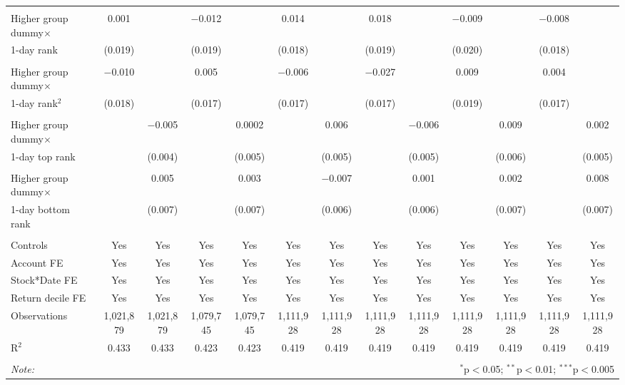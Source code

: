 \begin{tabular}{@{\extracolsep{2pt}}lcccccccccccc}
& & & & & & & & & & & & \\ 
Higher group dummy$\times$ & 0.001 &  & $-$0.012 &  & 0.014 &  & 0.018 &  & $-$0.009 &  & $-$0.008 &  \\ 
1-day rank & (0.019) &  & (0.019) &  & (0.018) &  & (0.019) &  & (0.020) &  & (0.018) &  \\ 
& & & & & & & & & & & & \\ 
Higher group dummy$\times$  & $-$0.010 &  & 0.005 &  & $-$0.006 &  & $-$0.027 &  & 0.009 &  & 0.004 &  \\ 
1-day rank$^2$& (0.018) &  & (0.017) &  & (0.017) &  & (0.017) &  & (0.019) &  & (0.017) &  \\ 
& & & & & & & & & & & & \\
Higher group dummy$\times$ &  & $-$0.005 &  & 0.0002 &  & 0.006 &  & $-$0.006 &  & 0.009 &  & 0.002 \\ 
1-day top rank &  & (0.004) &  & (0.005) &  & (0.005) &  & (0.005) &  & (0.006) &  & (0.005) \\ 
& & & & & & & & & & & & \\   
Higher group dummy$\times$ &  & 0.005 &  & 0.003 &  & $-$0.007 &  & 0.001 &  & 0.002 &  & 0.008 \\ 
1-day bottom rank&  & (0.007) &  & (0.007) &  & (0.006) &  & (0.006) &  & (0.007) &  & (0.007) \\

\hline \\[-1.8ex] 
Controls & Yes & Yes & Yes & Yes & Yes & Yes  & Yes & Yes & Yes & Yes & Yes & Yes \\ 
Account FE & Yes & Yes & Yes & Yes & Yes & Yes  & Yes & Yes & Yes & Yes & Yes & Yes \\ 
Stock*Date FE & Yes & Yes & Yes & Yes & Yes & Yes  & Yes & Yes & Yes & Yes & Yes & Yes  \\ 
Return decile FE & Yes & Yes & Yes & Yes & Yes & Yes  & Yes & Yes & Yes & Yes & Yes & Yes\\ 
Observations & 1,021,879 & 1,021,879 & 1,079,745 & 1,079,745 & 1,111,928 & 1,111,928 & 1,111,928 & 1,111,928 & 1,111,928 & 1,111,928 & 1,111,928 & 1,111,928 \\ 

R$^{2}$ & 0.433 & 0.433 & 0.423 & 0.423 & 0.419 & 0.419 & 0.419 & 0.419 & 0.419 & 0.419 & 0.419 & 0.419 \\ 

\hline 
\hline \\[-1.8ex] 
\textit{Note:}  & \multicolumn{12}{r}{$^{*}$p$<$0.05; $^{**}$p$<$0.01; $^{***}$p$<$0.005} \\ 
\end{tabular} 

